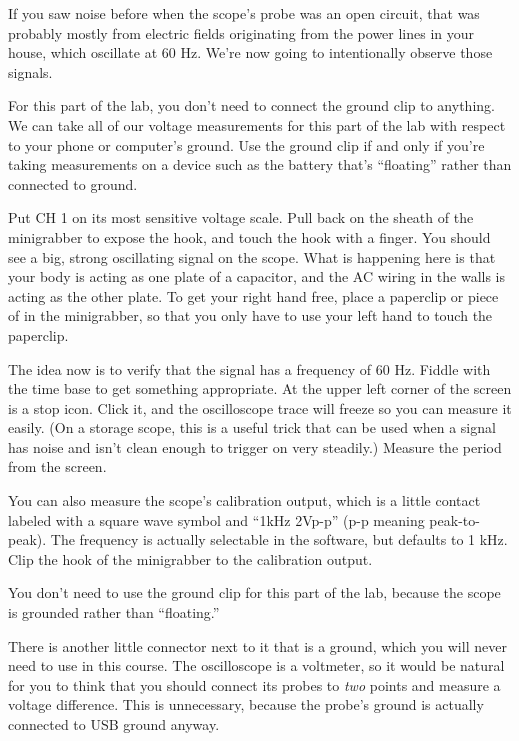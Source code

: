
If you saw noise before when the scope's probe was an open circuit, that was probably
mostly from electric fields originating from the power lines in your house, which oscillate
at 60 Hz. We're now going to intentionally observe those signals.

For this part of the lab, you don't need to connect the ground clip to anything.
We can take all of our voltage measurements for this part of the lab
with respect to your phone or computer's ground. 
Use the ground clip if and only if you're taking measurements on a device such as the battery that's
``floating'' rather than connected to ground.

Put CH 1 on its most sensitive voltage scale. Pull back on the sheath of the minigrabber
to expose the hook, and touch the hook with a finger. You should see a big, strong
oscillating signal on the scope. What is happening here is that your body is acting
as one plate of a capacitor, and the AC wiring in the walls is acting as the other
plate.
To get your right hand free, place a  paperclip or piece of in the minigrabber, so that you
only have to use your left hand to touch the paperclip.

The idea now is to verify that the signal has a frequency of 60 Hz. Fiddle with the time
base to get something appropriate. At the upper left corner of the screen is a stop icon.
Click it, and the oscilloscope trace will freeze so you can measure it easily. (On a storage
scope, this is a useful trick that can be used when a signal has noise and isn't clean enough
to trigger on very steadily.) Measure the period from the screen.


You can also measure the scope's calibration output, which is a little
contact labeled with a square wave symbol and ``1kHz 2Vp-p'' (p-p
meaning peak-to-peak).  The frequency is actually selectable in the
software, but defaults to 1 kHz.  Clip the hook of the minigrabber to
the calibration output.

You don't need to use the ground clip for this part of the lab, because the
scope is grounded rather than ``floating.''

There is another little connector next to it that
is a ground, which you will never need to use in this course.
The oscilloscope is a voltmeter, so it would be
natural for you to think that you should connect its probes to \emph{two} points and measure a voltage
difference. This is unnecessary, because the probe's ground is actually connected to USB ground anyway.

